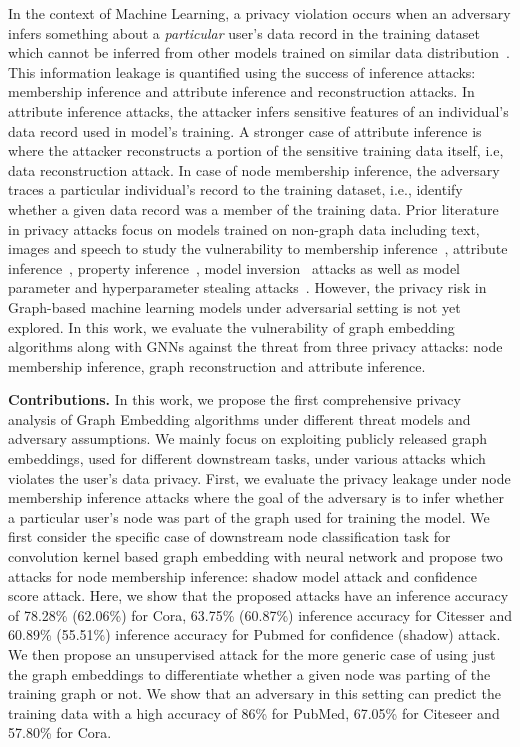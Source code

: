 In the context of Machine Learning, a privacy violation occurs when an adversary infers something about a \textit{particular} user's data record in the training dataset which cannot be inferred from other models trained on similar data distribution~\cite{7958568,8835245}.
This information leakage is quantified using the success of inference attacks: membership inference and attribute inference and reconstruction attacks.
In attribute inference attacks, the attacker infers sensitive features of an individual's data record used in model's training.
A stronger case of attribute inference is where the attacker reconstructs a portion of the sensitive training data itself, i.e, data reconstruction attack.
In case of node membership inference, the adversary traces a particular individual's record to the training dataset, i.e., identify whether a given data record was a member of the training data.
Prior literature in privacy attacks focus on models trained on non-graph data including text, images and speech to study the vulnerability to membership inference~\cite{7958568}, attribute inference~\cite{10.1504/IJSN.2015.071829}, property inference~\cite{10.1145/3243734.3243834}, model inversion~\cite{10.1145/2810103.2813677} attacks as well as model parameter and hyperparameter stealing attacks~\cite{10.5555/3241094.3241142,8418595}.
However, the privacy risk in Graph-based machine learning models under adversarial setting is not yet explored.
In this work, we evaluate the vulnerability of graph embedding algorithms along with GNNs against the threat from three privacy attacks: node membership inference, graph reconstruction and attribute inference.

\noindent\textbf{Contributions.} In this work, we propose the first comprehensive privacy analysis of Graph Embedding algorithms under different threat models and adversary assumptions.
We mainly focus on exploiting publicly released graph embeddings, used for different downstream tasks, under various attacks which violates the user's data privacy.
First, we evaluate the privacy leakage under node membership inference attacks where the goal of the adversary is to infer whether a particular user's node was part of the graph used for training the model.
We first consider the specific case of downstream node classification task for convolution kernel based graph embedding with neural network and propose two attacks for node membership inference: shadow model attack and confidence score attack.
Here, we show that the proposed attacks have an inference accuracy of 78.28\% (62.06\%) for Cora, 63.75\% (60.87\%) inference accuracy for Citesser and 60.89\% (55.51\%) inference accuracy for Pubmed for confidence (shadow) attack.
We then propose an unsupervised attack for the more generic case of using just the graph embeddings to differentiate whether a given node was parting of the training graph or not.
We show that an adversary in this setting can predict the training data with a high accuracy of 86\% for PubMed, 67.05\% for Citeseer and 57.80\% for Cora.


